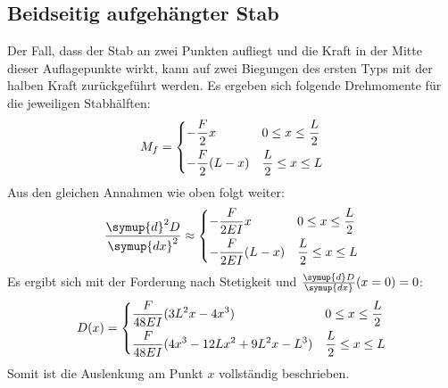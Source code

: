 \subsection{Beidseitig aufgehängter Stab}
Der Fall, dass der Stab an zwei Punkten aufliegt und die Kraft in der Mitte dieser
Auflagepunkte wirkt, kann auf zwei Biegungen des ersten Typs mit der halben Kraft zurückgeführt werden.
Es ergeben sich folgende Drehmomente für die jeweiligen Stabhälften:
\begin{align}
    M_f =
    \begin{dcases}
        -\frac{F}{2}x       & 0 \leq x \leq \frac{L}{2}\\
        -\frac{F}{2}(L-x)   & \frac{L}{2} \leq x \leq L
    \end{dcases}
\end{align}
Aus den gleichen Annahmen wie oben folgt weiter:
\begin{align}
    \frac{\symup{d}^2D}{\symup{dx}^2} \approx
    \begin{dcases}
        -\frac{F}{2EI} x     & 0 \leq x \leq \frac{L}{2}\\
        -\frac{F}{2EI} (L-x) & \frac{L}{2} \leq x \leq L
    \end{dcases}
\end{align}
Es ergibt sich mit der Forderung nach Stetigkeit und \mbox{$\frac{\symup{d}D}{\symup{dx}}(x=0) = 0$}:
\begin{equation}
    D(x) =
    \begin{dcases}
    \frac{F}{48EI}(3L^2x-4x^3) & 0 \leq x \leq \frac{L}{2}\\
    \frac{F}{48EI}(4x^3-12Lx^2+9L^2x -L^3) & \frac{L}{2} \leq x \leq L
    \end{dcases}
\end{equation}
Somit ist die Auslenkung am Punkt $x$ vollständig beschrieben.
